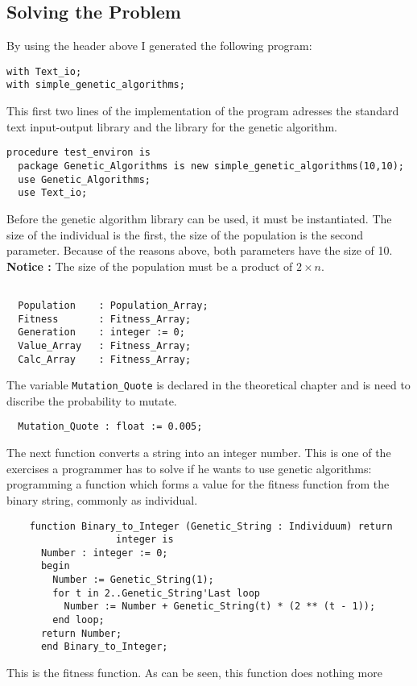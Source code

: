 \subsection{Solving the Problem}
By using the header above I generated the following program:\\
\begin{verbatim}
with Text_io;
with simple_genetic_algorithms;
\end{verbatim}
{\footnotesize This first two lines of the implementation of the program adresses the standard
text input-output library and the library for the genetic algorithm.}
\begin{verbatim}
procedure test_environ is
  package Genetic_Algorithms is new simple_genetic_algorithms(10,10);
  use Genetic_Algorithms;
  use Text_io;
\end{verbatim}
{\footnotesize Before the genetic algorithm library can be used, it must be instantiated. The
size of the individual is the first, the size of the population is the second
parameter. Because of the reasons above, both parameters have the size of 10.
{\bf Notice :} The size of the population must be a product of $2 \times n$.}
\begin{verbatim}

  Population    : Population_Array;
  Fitness       : Fitness_Array;
  Generation    : integer := 0;
  Value_Array   : Fitness_Array;
  Calc_Array    : Fitness_Array;
\end{verbatim}
{\footnotesize The variable {\tt Mutation\_Quote} is declared in the theoretical
chapter and is need to discribe the probability to mutate.}
\begin{verbatim}
  Mutation_Quote : float := 0.005;
\end{verbatim}
The next function converts a string into an integer number. This is one of the
exercises a programmer has to solve if he wants to use genetic algorithms: programming
a function which forms a value for the fitness function from the binary string,
commonly as individual.
\begin{verbatim}
    function Binary_to_Integer (Genetic_String : Individuum) return
                   integer is
      Number : integer := 0;
      begin
        Number := Genetic_String(1);
        for t in 2..Genetic_String'Last loop
          Number := Number + Genetic_String(t) * (2 ** (t - 1));
        end loop;
      return Number;
      end Binary_to_Integer;
\end{verbatim}
This is the fitness function. As can be seen, this function does nothing more
